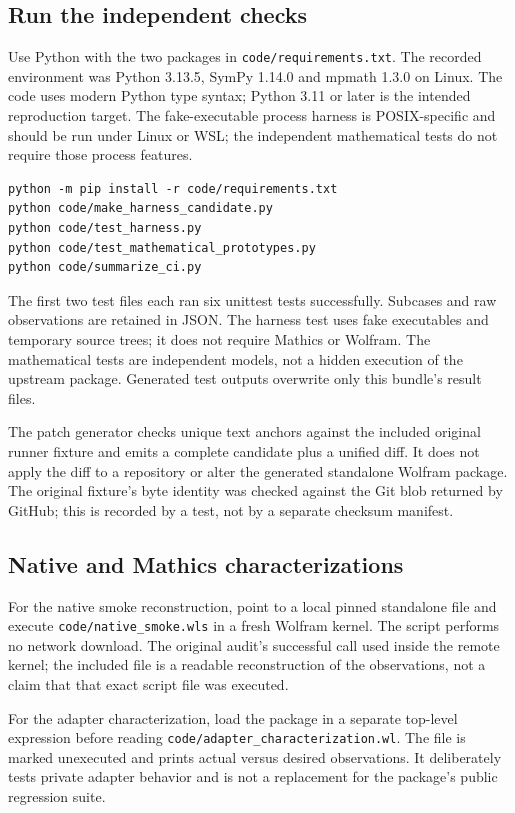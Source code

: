 \documentclass[11pt,letterpaper]{article}
\newcommand{\code}[1]{\texttt{\detokenize{#1}}}
\newcommand{\pathcode}[1]{\nolinkurl{#1}}
\begin{document}
\subsection{Run the independent checks}
Use Python with the two packages in \pathcode{code/requirements.txt}. The recorded environment was Python 3.13.5, SymPy 1.14.0 and mpmath 1.3.0 on Linux. The code uses modern Python type syntax; Python 3.11 or later is the intended reproduction target. The fake-executable process harness is POSIX-specific and should be run under Linux or WSL; the independent mathematical tests do not require those process features.
\begin{lstlisting}
python -m pip install -r code/requirements.txt
python code/make_harness_candidate.py
python code/test_harness.py
python code/test_mathematical_prototypes.py
python code/summarize_ci.py
\end{lstlisting}
The first two test files each ran six unittest tests successfully. Subcases and raw observations are retained in JSON. The harness test uses fake executables and temporary source trees; it does not require Mathics or Wolfram. The mathematical tests are independent models, not a hidden execution of the upstream package. Generated test outputs overwrite only this bundle's result files.

The patch generator checks unique text anchors against the included original runner fixture and emits a complete candidate plus a unified diff. It does not apply the diff to a repository or alter the generated standalone Wolfram package. The original fixture's byte identity was checked against the Git blob returned by GitHub; this is recorded by a test, not by a separate checksum manifest.

\subsection{Native and Mathics characterizations}
For the native smoke reconstruction, point \code{ASYMPTOTIC_AUDIT_SOURCE} to a local pinned standalone file and execute \pathcode{code/native_smoke.wls} in a fresh Wolfram kernel. The script performs no network download. The original audit's successful call used \code{URLDownload} inside the remote kernel; the included file is a readable reconstruction of the observations, not a claim that that exact script file was executed.

For the adapter characterization, load the package in a separate top-level expression before reading \pathcode{code/adapter_characterization.wl}. The file is marked unexecuted and prints actual versus desired observations. It deliberately tests private adapter behavior and is not a replacement for the package's public regression suite.
\end{document}
